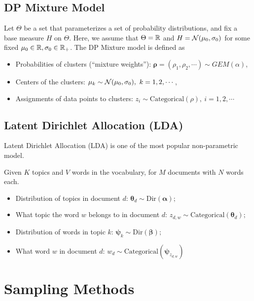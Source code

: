 \subsection{DP Mixture Model}
\begin{definition}
Let $\Theta$ be a set that parameterizes a set of probability distributions, and fix a base measure $H$ on $\Theta$. Here, we assume that $\Theta = \mathbb{R} $ and $H = \mathcal{N}(\mu_0, \sigma_0)$ for some fixed $\mu_0 \in \mathbb{R}, \sigma_0 \in \mathbb{R}_+$. The DP Mixture model is defined as
	\begin{itemize}
		\item Probabilities of clusters (``mixture weights''): $\boldsymbol{\rho} = (\rho_1, \rho_2, \cdots) \sim GEM(\alpha)$,
		\item Centers of the clusters: $\mu_k \sim \mathcal{N}(\mu_0, \sigma_0), \ k = 1,2,\cdots $,
		\item Assignments of data points to clusters: $z_i \sim \mathrm{Categorical}(\rho), \ i = 1,2,\cdots $
	\end{itemize}
\end{definition}

\subsection{Latent Dirichlet Allocation (LDA)}
Latent Dirichlet Allocation (LDA) is one of the most popular non-parametric model.
\begin{definition}
	Given $K$ topics and $V$ words in the vocabulary, for $M$ documents with $N$ words each.
	\begin{itemize}
		\item Distribution of topics in document $d$: $ \boldsymbol{\theta}_d \sim \mathrm{Dir}(\boldsymbol{\alpha});$
		\item What topic the word $w$ belongs to in document $d$: $z_{d, w} \sim \mathrm{Categorical}(\boldsymbol{\theta}_d); $
		\item Distribution of words in topic $k$: $ \boldsymbol{\psi}_k \sim \mathrm{Dir}(\boldsymbol{\beta}); $
		\item What word $w$ in document $d$: $w_{d} \sim \mathrm{Categorical}(\boldsymbol{\psi}_{z_{d, w}}) $
	\end{itemize} 
\end{definition}

\section{Sampling Methods}
